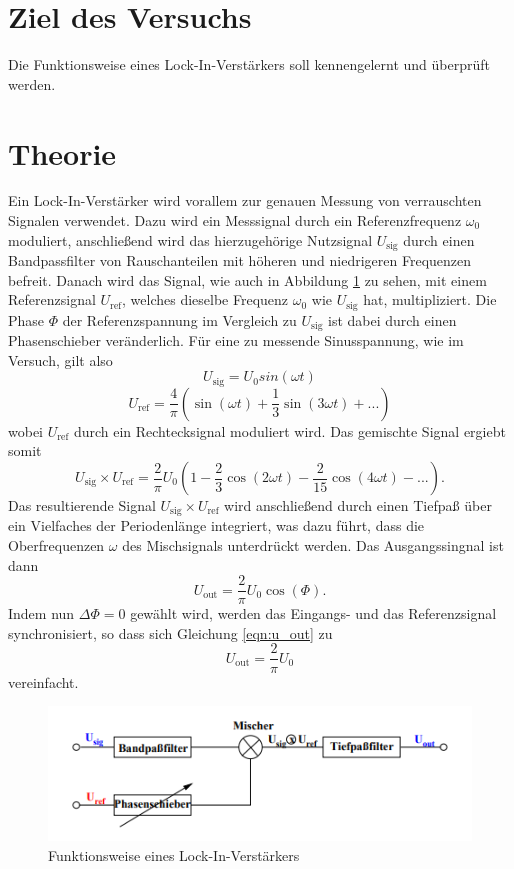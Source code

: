 \section{Ziel des Versuchs}
\label{sec:Ziel des Versuchs}
Die Funktionsweise eines Lock-In-Verstärkers soll kennengelernt und überprüft werden.
\section{Theorie}
\label{sec:Theorie}
    Ein Lock-In-Verstärker wird vorallem zur genauen Messung von verrauschten Signalen verwendet.
    Dazu wird ein Messsignal durch ein Referenzfrequenz $\omega_0$ moduliert, anschließend wird das
    hierzugehörige Nutzsignal $U_\text{sig}$ durch einen Bandpassfilter von Rauschanteilen mit höheren und niedrigeren Frequenzen
    befreit. Danach wird das Signal, wie auch in Abbildung \ref{fig:funktion} zu sehen, mit einem Referenzsignal
    $U_\text{ref}$, welches dieselbe Frequenz $\omega_0$ wie $U_\text{sig}$ hat, multipliziert. Die Phase $\Phi$ der Referenzspannung im Vergleich zu $U_\text{sig}$
    ist dabei durch einen Phasenschieber veränderlich. 
    Für eine zu messende Sinusspannung, wie im Versuch, gilt also
    \begin{equation}
        U_\text{sig} = U_0 sin(\omega t)
    \end{equation} 
    \begin{equation}
        U_\text{ref} = \frac {4}{\pi} (\sin (\omega t) + \frac {1}{3} \sin(3 \omega t) + ... )
    \end{equation}
    wobei $U_\text{ref}$ durch ein Rechtecksignal moduliert wird. Das gemischte Signal ergiebt somit
    \begin{equation}
        U_\text{sig} \times U_\text{ref} = \frac {2}{\pi} U_0 (1- \frac{2}{3} \cos (2 \omega t) - \frac {2}{15} \cos (4 \omega t) - ...).
    \end{equation}
    Das resultierende Signal $U_\text{sig} \times U_\text{ref}$ wird anschließend durch einen Tiefpaß über ein Vielfaches der Periodenlänge
    integriert, was dazu führt, dass die Oberfrequenzen $\omega$ des Mischsignals unterdrückt werden. Das Ausgangssingnal ist dann
    \begin{equation}
    \label{eqn:u_out}
        U_\text{out} = \frac{2}{\pi} U_0 \cos (\Phi) .
    \end{equation}
    Indem nun $\Delta \Phi = 0$ gewählt wird, werden das Eingangs- und das Referenzsignal synchronisiert, so dass sich Gleichung \ref{eqn:u_out}
    zu
    \begin{equation}
        U_\text{out} = \frac{2}{\pi} U_0
    \end{equation}
    vereinfacht. 
    \begin{figure}[!h]
        \centering
        \includegraphics{content/abbildung1.png}
        \caption{Funktionsweise eines Lock-In-Verstärkers \cite[1]{V303}}
        \label{fig:funktion}
        \end{figure}
        \newpage